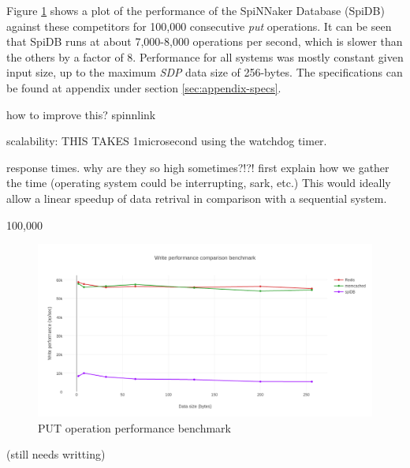 Figure \ref{fig:write-perf-benchmark} shows a plot of the performance of the SpiNNaker Database (SpiDB) against these competitors for 100,000 consecutive \textit{put} operations. It can be seen that SpiDB runs at about 7,000-8,000 operations per second, which is slower than the others by a factor of 8. Performance for all systems was mostly constant given input size, up to the maximum \textit{SDP} data size of 256-bytes. The specifications can be found at appendix under section \ref{sec:appendix-specs}.

how to improve this? spinnlink

scalability:
THIS TAKES 1microsecond using the watchdog timer.

response times. why are they so high sometimes?!?!
first explain how we gather the time (operating system could be interrupting, sark, etc.)
This would ideally allow a linear speedup of data retrival in comparison with a sequential system.

100,000



\begin{figure}
\begin{center}
	\includegraphics[width=1.4\textwidth, natwidth=1063, natheight=509]{images/write_performance.png}
\end{center}
\caption{PUT operation performance benchmark}
\label{fig:write-perf-benchmark}
\end{figure}
\fi


(still needs writting)



